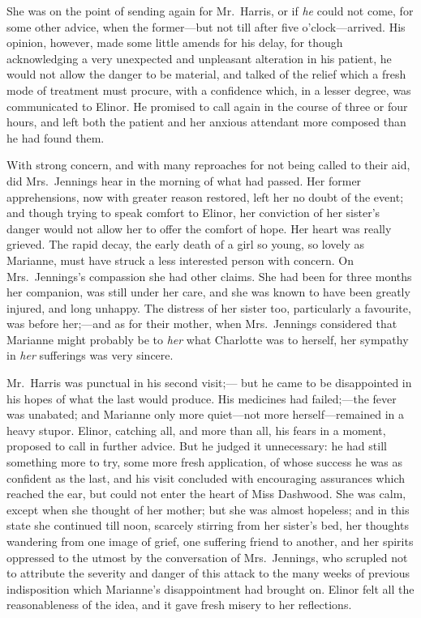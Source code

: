 \documentclass{article}
\begin{document}
She was on the point of sending again for Mr.\ Harris,
or if \emph{he} could not come, for some other advice,
when the former---but not till after five o'clock---arrived.
His opinion, however, made some little amends for his delay,
for though acknowledging a very unexpected and unpleasant
alteration in his patient, he would not allow the danger
to be material, and talked of the relief which a fresh
mode of treatment must procure, with a confidence which,
in a lesser degree, was communicated to Elinor.  He promised
to call again in the course of three or four hours,
and left both the patient and her anxious attendant more
composed than he had found them.

With strong concern, and with many reproaches for not
being called to their aid, did Mrs.\ Jennings hear in the
morning of what had passed.  Her former apprehensions,
now with greater reason restored, left her no doubt of
the event; and though trying to speak comfort to Elinor,
her conviction of her sister's danger would not allow her
to offer the comfort of hope.  Her heart was really grieved.
The rapid decay, the early death of a girl so young,
so lovely as Marianne, must have struck a less interested
person with concern.  On Mrs.\ Jennings's compassion
she had other claims.  She had been for three months
her companion, was still under her care, and she was
known to have been greatly injured, and long unhappy.
The distress of her sister too, particularly a favourite,
was before her;---and as for their mother, when Mrs.\ Jennings
considered that Marianne might probably be to \emph{her} what
Charlotte was to herself, her sympathy in \emph{her} sufferings
was very sincere.

Mr.\ Harris was punctual in his second visit;---%
but he came to be disappointed in his hopes of what the
last would produce.  His medicines had failed;---the fever
was unabated; and Marianne only more quiet---not more
herself---remained in a heavy stupor.  Elinor, catching all,
and more than all, his fears in a moment, proposed to call
in further advice.  But he judged it unnecessary: he had
still something more to try, some more fresh application,
of whose success he was as confident as the last, and his
visit concluded with encouraging assurances which reached
the ear, but could not enter the heart of Miss Dashwood.
She was calm, except when she thought of her mother;
but she was almost hopeless; and in this state she continued
till noon, scarcely stirring from her sister's bed,
her thoughts wandering from one image of grief,
one suffering friend to another, and her spirits oppressed
to the utmost by the conversation of Mrs.\ Jennings,
who scrupled not to attribute the severity and danger
of this attack to the many weeks of previous indisposition
which Marianne's disappointment had brought on.
Elinor felt all the reasonableness of the idea, and it
gave fresh misery to her reflections.
\end{document}
